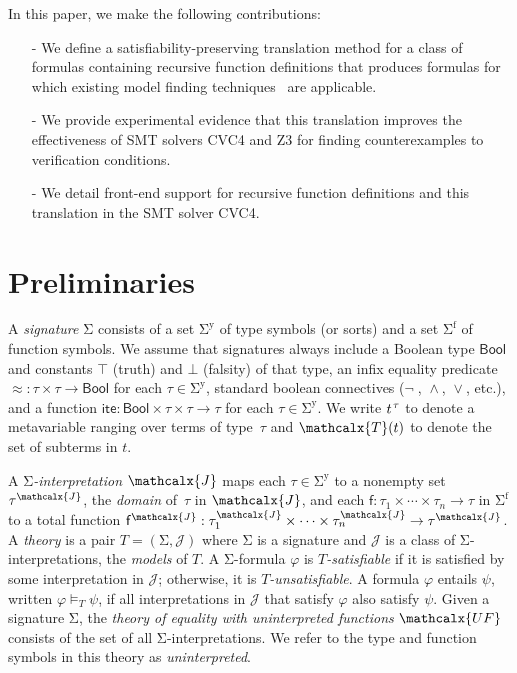 \documentclass[runningheads,a4paper]{llncs}
\newcommand{\con}[1]{\mathsf{#1}}
\let\oldSigma=\Sigma
\def\Sigma{\mathrm{\oldSigma}}
\let\oldneg=\neg
\def\neg{\oldneg\;}
\let\oldvee=\vee
\def\vee{\mathrel{\oldvee}}
\let\oldwedge=\wedge
\def\wedge{\mathrel{\oldwedge}}
\newcommand\cvc{CVC4\xspace}
\newcommand\ziii{Z3\xspace}
\newcommand{\teq}{\approx}
\newcommand{\terms}{\mathcalx{T}}
\newcommand{\I}{\mathcalx{J}} %
\newcommand{\ssorts}[1]{#1^\mathrm{y}}
\newcommand{\sfuns}[1]{#1^\mathrm{f}}
\newcommand{\sfundefs}[1]{#1^\mathrm{dfn}}
\newcommand\ty[1]{\con{#1}}
\newcommand{\Bool}{\ty{Bool}}
\newcommand{\ltrue}{\top}
\newcommand{\lfalse}{\bot}
\newcommand{\lite}{\con{ite}}
\newcommand{\vthinspace}{\kern+0.083333em}
\newcommand{\typ}[1]{^{\vthinspace #1}}
\newcommand{\Mo}{{\mathcal{\!J\!}}}
\newcommand{\euf}{\ensuremath{\mathcalx{UF}}\xspace}
\begin{document}
In this paper, we make the following contributions:
\begin{itemize}
\item[-] We define a satisfiability-preserving translation method for a class of formulas containing recursive function definitions
that produces formulas for which existing model finding techniques~\cite{GeDeM-CAV-09, ReyEtAl-1-RR-13,reynolds-et-al-2013} are applicable.
\item[-] We provide experimental evidence that this translation improves the effectiveness of SMT solvers \cvc and \ziii for finding counterexamples to verification conditions.
\item[-] We detail front-end support for recursive function definitions and this translation in the SMT solver \cvc.
\end{itemize}

\section{Preliminaries}
\label{sec:prelim}

A \emph{signature} $\Sigma$ consists of
a set $\ssorts{\Sigma}$ of type symbols (or sorts) and
a set $\sfuns{\Sigma}$ of function symbols.
We assume that signatures always include a Boolean type $\Bool$ and constants
$\ltrue$ (truth) and $\lfalse$ (falsity) of that type,
an infix equality predicate ${\teq} : \tau \times \tau \to \Bool$
for each $\tau \in \ssorts{\Sigma}$,
standard boolean connectives ($\neg$, $\wedge$, $\vee$, etc.),
and a function $\lite : \Bool \times \tau \times \tau \rightarrow \tau$ for each $\tau \in \ssorts{\Sigma}$.
We write $t\typ{\tau}$ to denote a metavariable ranging over terms of
type~$\tau$ and $\terms( t )$ to denote the set of subterms in $t$.

A \emph{$\Sigma$-interpretation $\I$} %
maps each $\tau \in \ssorts{\Sigma}$ to a nonempty set $\tau^\I$,
the \emph{domain} of~$\tau$ in $\I$,
and each $\con{f} : \tau_1 \times \cdots \times \tau_n \rightarrow \tau$ in
$\sfuns{\Sigma}$
to a total function $\con{f}^\I : \tau_1^\I \times \cdots \times \tau_n^\I \rightarrow \tau^\I$.
A \emph{theory} is a pair $T = (\Sigma, \Mo)$ where
$\Sigma$ is a signature and  $\Mo$ is a class of $\Sigma$-interpretations,
the \emph{models} of $T$.
A $\Sigma$-formula $\varphi$ is
\emph{$T$-satisfiable}
if it is satisfied by some interpretation in $\Mo$;
otherwise, it is \emph{$T$-unsatisfiable}.
A formula $\varphi$ entails $\psi$, written $\varphi \models_T \psi$,
if all interpretations in $\Mo$ that satisfy $\varphi$ also satisfy $\psi$.
Given a signature $\Sigma$,
the \emph{theory of equality with uninterpreted functions} \euf
consists of the set of all $\Sigma$-interpretations.
We refer to the type and function symbols in this theory as \emph{uninterpreted}.
\end{document}
